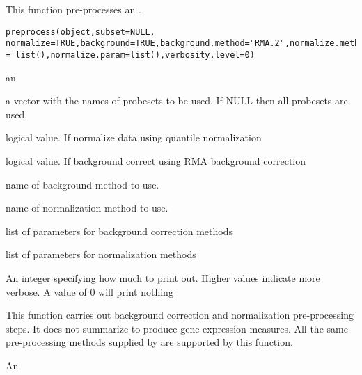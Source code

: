 \begin{Description}\relax
This function pre-processes an .
\end{Description}
\begin{Usage}
\begin{verbatim}
preprocess(object,subset=NULL, normalize=TRUE,background=TRUE,background.method="RMA.2",normalize.method="quantile",background.param = list(),normalize.param=list(),verbosity.level=0)
\end{verbatim}
\end{Usage}
\begin{Arguments}
\begin{ldescription}
\item[\code{object}] an 
\item[\code{subset}] a vector with the names of probesets to be used. If NULL
then all probesets are used.
\item[\code{normalize}] logical value. If  normalize data using
quantile normalization
\item[\code{background}] logical value. If  background correct
using RMA background correction
\item[\code{background.method}] name of background method to use.
\item[\code{normalize.method}] name of normalization method to use.
\item[\code{background.param}] list of parameters for background correction methods
\item[\code{normalize.param}] list of parameters for normalization methods
\item[\code{verbosity.level}] An integer specifying how much to print
out. Higher values indicate more verbose. A value of 0 will print nothing
\end{ldescription}
\end{Arguments}
\begin{Details}\relax
This function carries out background correction and normalization
pre-processing steps. It does not summarize to produce gene expression
measures. All the same pre-processing methods supplied by
 are supported by this function.
\end{Details}
\begin{Value}
An 
\end{Value}
